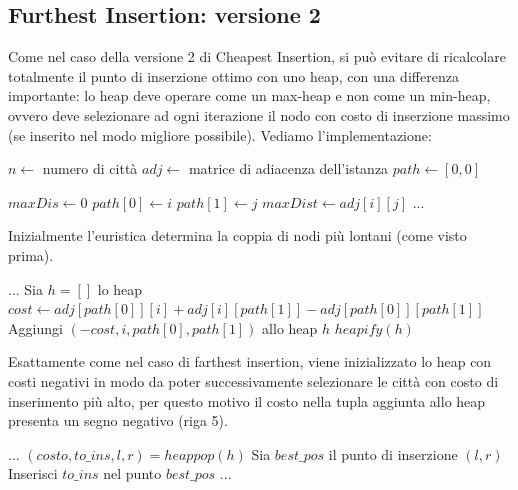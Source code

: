 \documentclass[a4paper,12pt]{report}
\begin{document}
\subsection{Furthest Insertion: versione 2}
Come nel caso della versione 2 di Cheapest Insertion, si può evitare di ricalcolare totalmente il punto di inserzione ottimo con uno heap, con una differenza importante: lo heap deve operare come un max-heap e non come un min-heap, ovvero deve selezionare ad ogni iterazione il nodo con costo di inserzione massimo (se inserito nel modo migliore possibile). Vediamo l'implementazione:
\begin{tcolorbox}[colframe=black, colback=white, boxrule=0.5pt, title=Furthest Insertion Versione 2, coltitle=black, fonttitle=\bfseries, colbacktitle=white, breakable]
  \begin{algorithmic}[1]
    \State $n \gets$ numero di città
    \State $adj \gets$ matrice di adiacenza dell'istanza
    \State $path \gets [0, 0]$
    
    \State $maxDis \gets 0$
          \State $path[0] \gets i$
          \State $path[1] \gets j$
          \State $maxDist \gets adj[i][j]$
        \EndIf
      \EndFor
    \EndFor
    \State ...
  \end{algorithmic}
\end{tcolorbox}
Inizialmente l'euristica determina la coppia di nodi più lontani (come visto prima).
\begin{tcolorbox}[colframe=black, colback=white, boxrule=0.5pt, title=Furthest Insertion Versione 2, coltitle=black, fonttitle=\bfseries, colbacktitle=white, breakable]
  \begin{algorithmic}[1]
    \State ...
    \State Sia $h = []$ lo heap
      \State $cost \gets adj[path[0]][i] + adj[i][path[1]] - adj[path[0]][path[1]]$
      \State Aggiungi $(-cost, i, path[0], path[1])$ allo heap $h$
    \EndFor
    \State $heapify(h)$
  \end{algorithmic}
\end{tcolorbox}
Esattamente come nel caso di farthest insertion, viene inizializzato lo heap con costi negativi in modo da poter successivamente selezionare le città con costo di inserimento più alto, per questo motivo il costo nella tupla aggiunta allo heap presenta un segno negativo (riga 5).
\begin{tcolorbox}[colframe=black, colback=white, boxrule=0.5pt, title=Furthest Insertion Versione 2, coltitle=black, fonttitle=\bfseries, colbacktitle=white, breakable]
  \begin{algorithmic}[1]
    \State ...
      \State $(costo, to\_ins, l, r) = heappop(h)$
      \State Sia $best\_pos$ il punto di inserzione $(l, r)$
      \State Inserisci $to\_ins$ nel punto $best\_pos$
      \State ...
    \EndWhile
  \end{algorithmic}
\end{tcolorbox}
\end{document}
